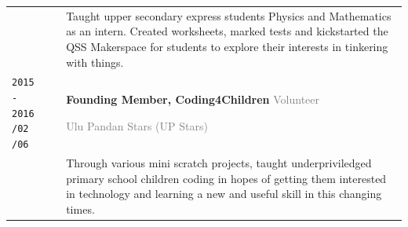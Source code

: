 \documentclass[11pt]{article}
\newcommand{\monoSp}[1]{{\usefont{T1}{rbtm}{m}{n} #1}}
\newcommand{\code}[1]{\colorbox{code_back}{\monoSp{#1}}}
\begin{document}
{\begin{tabularx}{\textwidth}{@{}l p{0.20cm} X @{}}
		& & Taught upper secondary express students Physics and Mathematics as an intern. Created worksheets, marked tests and kickstarted the QSS Makerspace for students to explore their interests in tinkering with things. \\
		\makecell{\texttt{\large 2015 - 2016} \vspace{-1mm} \\ \texttt{\footnotesize /02} \hspace{1.5em} \texttt{\footnotesize /06}} & & \textbf{Founding Member, Coding4Children} \hfill \textcolor{gray}{Volunteer} \par \textcolor{gray}{Ulu Pandan Stars {\footnotesize (UP Stars)}}\\[-0.5em]
		& & Through various mini \code{scratch} projects, taught underpriviledged primary school children coding in hopes of getting them interested in technology and learning a new and useful skill in this changing times. 
	\end{tabularx}
}
\end{document}
